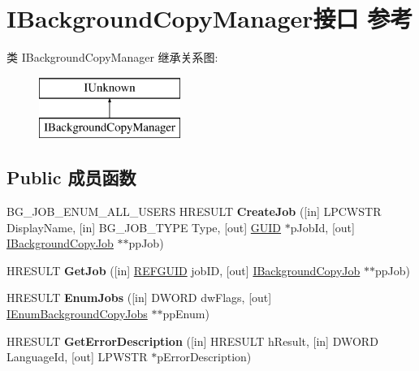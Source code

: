 \hypertarget{interface_i_background_copy_manager}{}\section{I\+Background\+Copy\+Manager接口 参考}
\label{interface_i_background_copy_manager}
类 I\+Background\+Copy\+Manager 继承关系图\+:\begin{figure}[H]
\begin{center}
\leavevmode
\includegraphics[height=2.000000cm]{interface_i_background_copy_manager}
\end{center}
\end{figure}
\subsection*{Public 成员函数}
\begin{DoxyCompactItemize}
\item 
\mbox{\label{interface_i_background_copy_manager_a5cfa210a978c6fbd4c9f97cbe93d434e}} 
B\+G\+\_\+\+J\+O\+B\+\_\+\+E\+N\+U\+M\+\_\+\+A\+L\+L\+\_\+\+U\+S\+E\+RS H\+R\+E\+S\+U\+LT {\bfseries Create\+Job} (\mbox{[}in\mbox{]} L\+P\+C\+W\+S\+TR Display\+Name, \mbox{[}in\mbox{]} B\+G\+\_\+\+J\+O\+B\+\_\+\+T\+Y\+PE Type, \mbox{[}out\mbox{]} \hyperlink{interface_g_u_i_d}{G\+U\+ID} $\ast$p\+Job\+Id, \mbox{[}out\mbox{]} \hyperlink{interface_i_background_copy_job}{I\+Background\+Copy\+Job} $\ast$$\ast$pp\+Job)
\item 
\mbox{\label{interface_i_background_copy_manager_a46e35724d5ecb48d9dc94291764ed917}} 
H\+R\+E\+S\+U\+LT {\bfseries Get\+Job} (\mbox{[}in\mbox{]} \hyperlink{struct___g_u_i_d}{R\+E\+F\+G\+U\+ID} job\+ID, \mbox{[}out\mbox{]} \hyperlink{interface_i_background_copy_job}{I\+Background\+Copy\+Job} $\ast$$\ast$pp\+Job)
\item 
\mbox{\label{interface_i_background_copy_manager_a10963e62e32266e91afa6f1ec3d38f0b}} 
H\+R\+E\+S\+U\+LT {\bfseries Enum\+Jobs} (\mbox{[}in\mbox{]} D\+W\+O\+RD dw\+Flags, \mbox{[}out\mbox{]} \hyperlink{interface_i_enum_background_copy_jobs}{I\+Enum\+Background\+Copy\+Jobs} $\ast$$\ast$pp\+Enum)
\item 
\mbox{\label{interface_i_background_copy_manager_a463f1944f3c8348846b33057a0c7c302}} 
H\+R\+E\+S\+U\+LT {\bfseries Get\+Error\+Description} (\mbox{[}in\mbox{]} H\+R\+E\+S\+U\+LT h\+Result, \mbox{[}in\mbox{]} D\+W\+O\+RD Language\+Id, \mbox{[}out\mbox{]} L\+P\+W\+S\+TR $\ast$p\+Error\+Description)
\end{DoxyCompactItemize}
